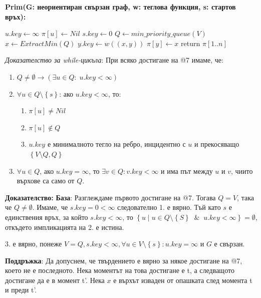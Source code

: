 \documentclass{article}
\renewcommand{\\}{\newline}
\newcommand{\amp}{\;\&\;}
\newcommand{\sep}{\;|\;}
\newcommand{\doc}{\textbf{Доказателство: }}
\begin{document}
\textbf{Prim(G: неориентиран свързан граф, w: теглова функция, s: стартов връх):}    
\begin{algorithmic}[1]
    \State \(u.key \gets \infty\) 
    \State \(\pi[u] \gets Nil\) 
  \EndFor
  \State \(s.key \gets 0\) 
  \State \(Q \gets min\_priority\_queue(V)\) 
    \State \(x \gets ExtractMin(Q)\) 
        \State \(y.key \gets w((x, y))\) 
        \State \(\pi[y] \gets x\)  
      \EndIf
    \EndFor
    \EndWhile
  \State return \(\pi[1..n]\)  
\end{algorithmic}

\textit{Доказателство за while-цикъла}:
При всяко достигане на @7 имаме, че:
\begin{enumerate}
    \item \(Q \not= \emptyset \rightarrow (\exists u \in Q:\; u.key < \infty)\) 
    \item \(\forall u \in Q \setminus \left\{s\right\}\): ако \(u.key < \infty\), то:
      \begin{enumerate}
        \item \(\pi[u] \not= Nil\) 
        \item \(\pi[u] \not\in Q\) 
        \item \(u.key\) е минималното тегло на ребро, инцидентно с \(u\) и прекосяващо \(\left\{V \setminus Q, Q\right\}\)   
      \end{enumerate}
    \item \(\forall u \in Q\), ако \(u.key = \infty\), то \(\exists v \in Q: v.key < \infty\) и има път между \(u\) и \(v\), чиито върхове са само от \(Q\).       
\end{enumerate}

\doc \textbf{База}: Разглеждаме първото достигане на @7. Тогава \(Q = V\), така че \(Q \not= \emptyset\). Имаме, че \(s.key = 0 < \infty\)  следователно 1. е вярно. Тъй като \(s\) е единствения връх, за който \(s.key < \infty\), то \(\left\{u \sep u \in Q \setminus \left\{S\right\} \;\amp\; u.key < \infty\right\} = \emptyset\), откъдето импликацията на 2. е истина.

3. е вярно, понеже \(V = Q, s.key < \infty, \forall u \in V \setminus \left\{s\right\}: u.key = \infty\) и \(G\) е свързан.

\textbf{Поддръжка}: Да допуснем, че твърдението е вярно за някое достигане на @7, което не е последното. Нека моментът на това достигане е t, а следващото достигане да е в момент t'. Нека \(x\) е върхът изваден от опашката след момента t и преди t'.
\end{document}
